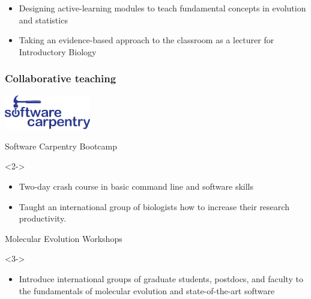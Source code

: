 {{\begin{frame}[t]
    \begin{itemize}
        \item<3-> Designing active-learning modules to teach fundamental concepts
            in evolution and statistics
        \item<4-> Taking an evidence-based approach to the classroom as a lecturer
            for Introductory Biology
    \end{itemize}
\end{frame}
}

\begin{frame}
    \frametitle{Collaborative teaching}
    \centerline{
    \includegraphics[height=1.5cm]{../images/software-carpentry.pdf}
    }
    Software Carpentry Bootcamp\\

    \begin{uncoverenv}<2->
    \begin{itemize}
        \item Two-day crash course in basic command line and software skills
        \item Taught an international group of biologists how to increase their
            research productivity.
    \end{itemize}
    \end{uncoverenv}
    
    Molecular Evolution Workshops\\

    \begin{uncoverenv}<3->
    \begin{itemize}
        \item Introduce international groups of graduate students, postdocs,
            and faculty to the fundamentals of molecular evolution and
            state-of-the-art software
    \end{itemize}
    \end{uncoverenv}
\end{frame}


}
